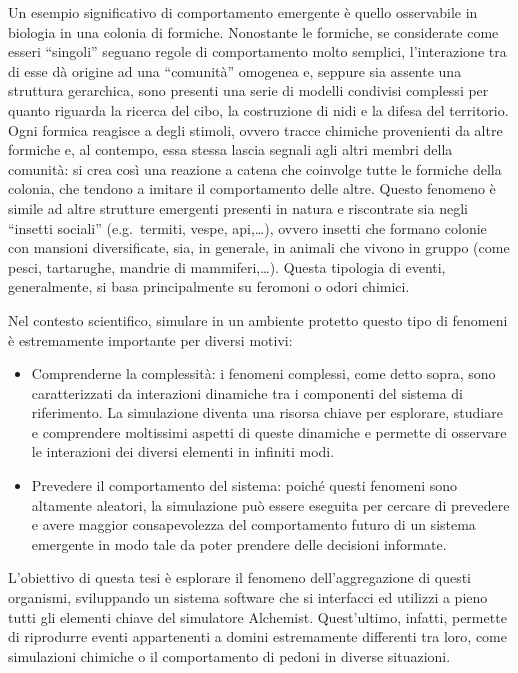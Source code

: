 \documentclass[12pt,a4paper,openright,twoside]{book}
\begin{document}
Un esempio significativo di comportamento emergente è quello osservabile in biologia in una colonia di formiche. Nonostante le formiche, se considerate 
come esseri ``singoli'' seguano regole di comportamento molto semplici,
l'interazione tra di esse dà origine ad una ``comunità'' omogenea e, seppure sia assente una struttura gerarchica, sono presenti una serie di modelli condivisi
complessi per quanto riguarda la ricerca del cibo, la costruzione di nidi e la difesa del territorio.
Ogni formica reagisce a degli stimoli, ovvero tracce chimiche provenienti da altre formiche e, al contempo, essa stessa lascia segnali agli altri membri
della comunità: si crea così una reazione a catena che coinvolge tutte le formiche della colonia, che tendono a imitare il comportamento delle altre.
Questo fenomeno è simile ad altre strutture emergenti presenti in natura e riscontrate sia negli ``insetti sociali'' (e.g.\ termiti, vespe, api,\dots),
ovvero insetti che formano colonie con mansioni diversificate, sia, in generale, in animali che vivono in gruppo 
(come pesci, tartarughe, mandrie di mammiferi,\ldots). Questa tipologia di eventi, generalmente, si basa principalmente su feromoni o odori chimici.

Nel contesto scientifico, simulare in un ambiente protetto questo tipo di fenomeni è estremamente importante per diversi motivi:
\begin{itemize}
    \item Comprenderne la complessità: i fenomeni complessi, come detto sopra, sono caratterizzati da interazioni dinamiche tra
    i componenti del sistema di riferimento. La simulazione diventa una risorsa chiave per esplorare, studiare e comprendere 
    moltissimi aspetti di queste dinamiche e permette di osservare le interazioni dei diversi elementi in infiniti modi.
    \item Prevedere il comportamento del sistema: poiché questi fenomeni sono altamente aleatori, la simulazione può essere 
    eseguita per cercare di prevedere e avere maggior consapevolezza del comportamento
    futuro di un sistema emergente in modo tale da poter prendere delle decisioni informate.   
\end{itemize}

L'obiettivo di questa tesi è esplorare il fenomeno dell'aggregazione di questi organismi, sviluppando un sistema software che 
si interfacci ed utilizzi a pieno tutti gli elementi chiave del simulatore Alchemist. Quest'ultimo, infatti, permette di riprodurre eventi appartenenti 
a domini estremamente differenti tra loro, come simulazioni chimiche o il comportamento di pedoni in diverse situazioni.
\end{document}
